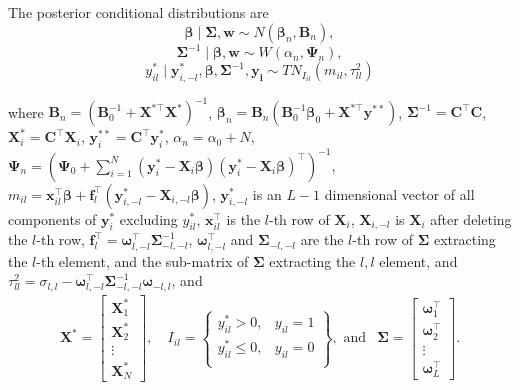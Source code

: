 The posterior conditional distributions are
\begin{equation*}
	\bm{\beta}\mid \bm{\Sigma},\bm{w}\sim{N}(\bm{\beta}_n,\bm{B}_n),
\end{equation*}
\begin{equation*}
	\bm{\Sigma}^{-1}\mid \bm{\beta},\bm{w}\sim{W}(\alpha_n,\bm{\Psi}_n),
\end{equation*}
\begin{equation*}
	y_{il}^*\mid \bm{y}_{i,-l}^*,\bm{\beta},\bm{\Sigma}^{-1},\bm{y_i}\sim{T}{N}_{I_{il}}(m_{il},\tau_{ll}^2)
\end{equation*}

where $\bm{B}_n=(\bm{B}_0^{-1}+\bm{X}^{*\top}\bm{X}^*)^{-1}$, $\bm{\beta}_n=\bm{B}_n(\bm{B}_0^{-1}\bm{\beta}_0+\bm{X}^{*\top}\bm{y}^{**})$, $\bm{\Sigma}^{-1}=\bm{C}^{\top}\bm{C}$, $\bm{X}_i^{*}=\bm{C}^{\top}\bm{X}_i$, $\bm{y}_i^{**}=\bm{C}^{\top}\bm{y}_i^*$, $\alpha_n=\alpha_0+N$, $\bm{\Psi}_n=(\bm{\Psi}_0+\sum_{i=1}^N (\bm{y}_i^*-\bm{X}_i\bm{\beta})(\bm{y}_i^*-\bm{X}_i\bm{\beta})^{\top})^{-1}$,  $m_{il}=\bm{x}_{il}^{\top}\bm{\beta}+\bm{f}_l^{\top}(\bm{y}_{i,-l}^*-\bm{X}_{i,-l}\bm{\beta})$, $\bm{y}_{i,-l}^*$ is an $L-1$ dimensional vector of all components of $\bm{y}_i^*$ excluding $y_{il}^*$, $\bm{x}_{il}^{\top}$ is the $l$-th row of $\bm{X}_i$, $\bm{X}_{i,-l}$ is $\bm{X}_{i}$ after deleting the $l$-th row, $\bm{f}_l^{\top}=\bm{\omega}_{l,-l}^{\top}\bm{\Sigma}_{-l,-l}^{-1}$, $\bm{\omega}_{l,-l}^{\top}$ and $\bm{\Sigma}_{-l,-l}$ are the $l$-th row of $\bm{\Sigma}$ extracting the $l$-th element, and the sub-matrix of $\bm{\Sigma}$ extracting the $l,l$ element, and $\tau_{ll}^2=\sigma_{l,l}-\bm{\omega}_{l,-l}^{\top}\bm{\Sigma}_{-l,-l}^{-1}\bm{\omega}_{-l,l}$, and 
\begin{align*}
	\bm{X}^*=\begin{bmatrix}\bm{X}_1^*\\
		\bm{X}_2^*\\
		\vdots\\
		\bm{X}_N^*
	\end{bmatrix}, & \ I_{il}=\begin{Bmatrix} y_{il}^*> 0, & y_{il}=1\\
	y_{il}^*\leq 0 , & y_{il}=0\\
\end{Bmatrix},\text{ and}&\bm{\Sigma}=\begin{bmatrix}\bm{\omega}_1^{\top} \\ \bm{\omega}_2^{\top} \\ \vdots \\ \bm{\omega}_{L}^{\top} \end{bmatrix}.
\end{align*}

